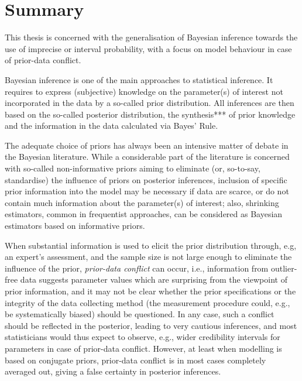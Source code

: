 
\chapter*{Summary}

This thesis is concerned with the generalisation of Bayesian inference towards the use of imprecise or interval probability,
with a focus on model behaviour in case of prior-data conflict.

Bayesian inference is one of the main approaches to statistical inference.
It requires to express (subjective) knowledge on the parameter(s) of interest not incorporated in the data by a so-called prior distribution.
All inferences are then based on the so-called posterior distribution,
the synthesis*** of prior knowledge and the information in the data calculated via Bayes' Rule.

The adequate choice of priors has always been an intensive matter of debate in the Bayesian literature.
While a considerable part of the literature is concerned with so-called non-informative priors
aiming to eliminate (or, so-to-say, standardise) the influence of priors on posterior inferences,
inclusion of specific prior information into the model may be necessary if data are scarce,
or do not contain much information about the parameter(s) of interest;
also, shrinking estimators, common in frequentist approaches, can be considered as Bayesian estimators based on informative priors.

When substantial information is used to elicit the prior distribution through, e.g, an expert's assessment,
and the sample size is not large enough to eliminate the influence of the prior, \emph{prior-data conflict} can occur,
i.e., information from outlier-free data suggests parameter values which are surprising from the viewpoint of prior information,
and it may not be clear whether the prior specifications or the integrity of the data collecting method
(the measurement procedure could, e.g., be systematically biased) should be questioned.
In any case, such a conflict should be reflected in the posterior, leading to very cautious inferences,
and most statisticians would thus expect to observe, e.g., wider credibility intervals for parameters in case of prior-data conflict.
However, at least when modelling is based on conjugate priors, prior-data conflict is in most cases completely averaged out,
giving a false certainty in posterior inferences.


